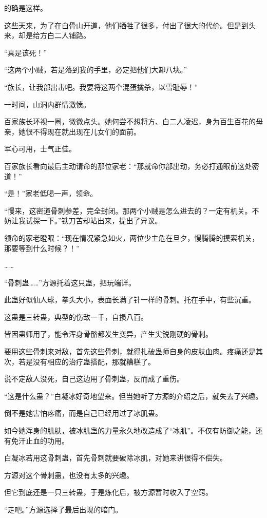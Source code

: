 \begin{this_body}
的确是这样。

这些天来，为了在白骨山开道，他们牺牲了很多，付出了很大的代价。但是到头来，却是给方白二人铺路。

“真是该死！”

“这两个小贼，若是落到我的手里，必定把他们大卸八块。”

“族长，让我部出击吧。我要将这两个混蛋擒杀，以雪耻辱！”

一时间，山洞内群情激愤。

百家族长环视一圈，微微点头。她何尝不想将方、白二人凌迟，身为百生百花的母亲，她恨不得现在就出现在儿女们的面前。

军心可用，士气正佳。

百家族长看向最后主动请命的那位家老：“那就命你部出动，务必打通眼前这处密道！”

“是！”家老低喝一声，领命。

“慢来，这密道骨刺参差，完全封闭。那两个小贼是怎么进去的？一定有机关。不妨让我试探一下。”铁刀苦却站出来，提出了异议。

领命的家老瞪眼：“现在情况紧急如火，两位少主危在旦夕，慢腾腾的摸索机关，那要等到什么时候？！”

……

“骨刺蛊……”方源托着这只蛊，把玩端详。

此蛊好似仙人球，拳头大小，表面长满了针一样的骨刺。托在手中，有些沉重。

这蛊是三转蛊，典型的伤敌一千，自损八百。

皆因蛊师用了，能令浑身骨骼都发生变异，产生尖锐刚硬的骨刺。

要用这些骨刺来对敌，首先这些骨刺，就得扎破蛊师自身的皮肤血肉。疼痛还是其次，若是没有相应的治疗蛊搭配，那就糟糕了。

说不定敌人没死，自己这边用了骨刺蛊，反而成了重伤。

“这是什么蛊？”白凝冰好奇地望来。但当她听了方源的介绍之后，就失去了兴趣。

倒不是她害怕疼痛，而是自己已经用过了冰肌蛊。

如今她浑身的肌肤，被冰肌蛊的力量永久地改造成了“冰肌”。不仅有防御之能，还有免汗止血的功用。

白凝冰若用这骨刺蛊，首先骨刺就要破除冰肌，对她来讲很得不偿失。

方源对这个骨刺蛊，也没有太多的兴趣。

但它到底还是一只三转蛊，于是炼化后，被方源暂时收入了空窍。

“走吧。”方源选择了最后出现的暗门。


\end{this_body}
